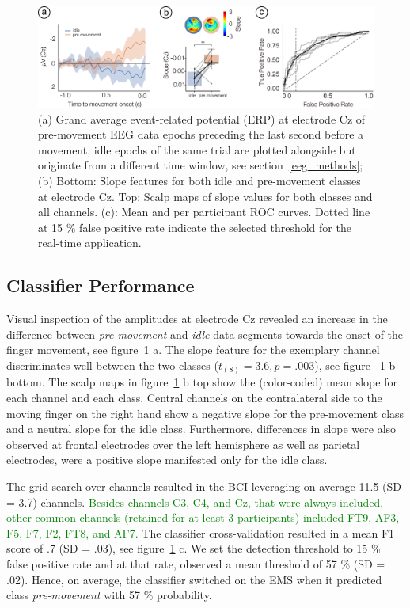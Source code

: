 \begin{figure}
    \centering
    \includegraphics[width=\textwidth]{figures/eeg_results.pdf}
    \caption{(a) Grand average event-related potential (ERP) at electrode Cz of pre-movement EEG data epochs preceding the last second before a movement, idle epochs of the same trial are plotted alongside but originate from a different time window, see section~\ref{eeg_methods}; (b) Bottom: Slope features for both idle and pre-movement classes at electrode Cz. Top: Scalp maps of slope values for both classes and all channels. (c): Mean and per participant ROC curves. Dotted line at 15 \% false positive rate indicate the selected threshold for the real-time application.}
    \label{fig:EEG_results}
\end{figure}

\subsection{Classifier Performance}
Visual inspection of the amplitudes at electrode Cz revealed an increase in the difference between \textit{pre-movement} and \textit{idle} data segments towards the onset of the finger movement, see figure~\ref{fig:EEG_results} a. The slope feature for the exemplary channel discriminates well between the two classes (${t_{(8)}} = 3.6, p = .003$), see figure ~\ref{fig:EEG_results} b bottom. The scalp maps in figure~\ref{fig:EEG_results} b top show the (color-coded) mean slope for each channel and each class. Central channels on the contralateral side to the moving finger on the right hand show a negative slope for the pre-movement class and a neutral slope for the idle class. Furthermore, differences in slope were also observed at frontal electrodes over the left hemisphere as well as parietal electrodes, were a positive slope manifested only for the idle class. 

The grid-search over channels resulted in the BCI leveraging on average 11.5 (SD = 3.7) channels. \textcolor{green}{Besides channels C3, C4, and Cz, that were always included, other common channels (retained for at least 3 participants) included FT9, AF3, F5, F7, F2, FT8, and AF7.} The classifier cross-validation resulted in a mean F1 score of .7 (SD = .03), see figure~\ref{fig:EEG_results} c. We set the detection threshold to 15 \% false positive rate and at that rate, observed a mean threshold of 57 \% (SD = .02). Hence, on average, the classifier switched on the EMS when it predicted class \textit{pre-movement} with 57 \% probability.

